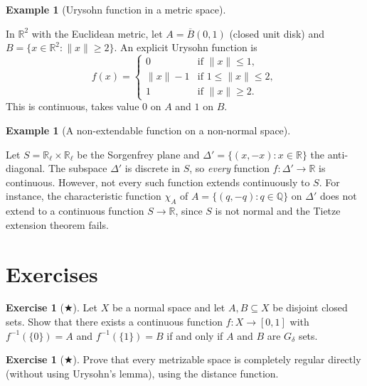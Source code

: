 \documentclass[11pt,a4paper,twoside]{book}
\theoremstyle{remark}
\theoremstyle{definition}
\newtheorem{exampleplain}[theorem]{Example}
\newtheorem{exerciseplain}[theorem]{Exercise}
\theoremstyle{definition}
\newenvironment{example}[1][]{%
  \begin{exampleplain}[#1]\itshape
}{%
  \end{exampleplain}
}
\newenvironment{exercise}[1][]{%
  \begin{exerciseplain}[#1]
}{%
  \end{exerciseplain}
}
\begin{document}
\begin{example}[Urysohn function in a metric space]
\label{ex:urysohn-metric}
In $\mathbb{R}^2$ with the Euclidean metric, let $A=\overline{B}(0,1)$
(closed unit disk) and $B=\{x\in\mathbb{R}^2:\|x\|\ge 2\}$.  An
explicit Urysohn function is
\[
  f(x)=\begin{cases}
    0              & \text{if }\|x\|\le 1,\\
    \|x\|-1        & \text{if }1\le\|x\|\le 2,\\
    1              & \text{if }\|x\|\ge 2.
  \end{cases}
\]
This is continuous, takes value $0$ on $A$ and $1$ on $B$.
\end{example}

\begin{example}[A non-extendable function on a non-normal space]
\label{ex:non-extendable}
Let $S=\mathbb{R}_\ell\times\mathbb{R}_\ell$ be the Sorgenfrey plane
and $\Delta'=\{(x,-x):x\in\mathbb{R}\}$ the anti-diagonal.  The
subspace $\Delta'$ is discrete in $S$, so \emph{every} function
$f\colon\Delta'\to\mathbb{R}$ is continuous.  However, not every such
function extends continuously to $S$.  For instance, the characteristic
function $\chi_A$ of $A=\{(q,-q):q\in\mathbb{Q}\}$ on $\Delta'$ does
not extend to a continuous function $S\to\mathbb{R}$, since $S$ is not
normal and the Tietze extension theorem fails.
\end{example}

\section{Exercises}
\label{sec:urysohn-exercises}

\begin{exercise}[$\bigstar$]
\label{exo:urysohn-1}
Let $X$ be a normal space and let $A,B\subseteq X$ be disjoint closed
sets.  Show that there exists a continuous function $f\colon X\to[0,1]$
with $f^{-1}(\{0\})=A$ and $f^{-1}(\{1\})=B$ if and only if $A$ and
$B$ are $G_\delta$ sets.
\end{exercise}

\begin{exercise}[$\bigstar$]
\label{exo:urysohn-2}
Prove that every metrizable space is completely regular directly
(without using Urysohn's lemma), using the distance function.
\end{exercise}
\end{document}
